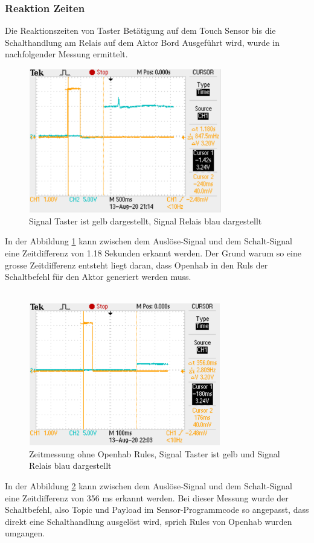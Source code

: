 \subsubsection{Reaktion Zeiten}
Die Reaktionszeiten von Taster Betätigung auf dem Touch Sensor bis die Schalthandlung am Relais auf dem Aktor Bord  Ausgeführt wird, wurde in nachfolgender Messung ermittelt. 
\begin{figure}[H]
	\centering
	\includegraphics[width=0.75\textwidth]{graphics/ZeitmessungOH.PNG}
	\caption{Signal Taster ist gelb dargestellt, Signal Relais blau dargestellt}
	\label{pic: Zeitmessung Openhab}
\end{figure}
In der Abbildung \ref{pic: Zeitmessung Openhab} kann zwischen dem Auslöse-Signal und dem Schalt-Signal eine Zeitdifferenz von 1.18 Sekunden erkannt werden. Der Grund warum so eine grosse Zeitdifferenz entsteht liegt daran, dass Openhab in den Ruls der Schaltbefehl für den Aktor generiert werden muss.\\
\\
\begin{figure}[H]
	\centering
	\includegraphics[width=0.75\textwidth]{graphics/ZeitmessungohneOH.PNG}
	\caption{Zeitmessung ohne Openhab Rules, Signal Taster ist gelb und Signal Relais blau dargestellt}
\label{pic: Zeitmessung ohne Openhab}
\end{figure}
In der Abbildung \ref{pic: Zeitmessung ohne Openhab} kann zwischen dem Auslöse-Signal und dem Schalt-Signal eine Zeitdifferenz von 356 ms erkannt werden. Bei dieser Messung wurde der Schaltbefehl, also Topic und Payload im Sensor-Programmcode so angepasst, dass direkt eine Schalthandlung ausgelöst wird, sprich Rules von Openhab wurden umgangen.

